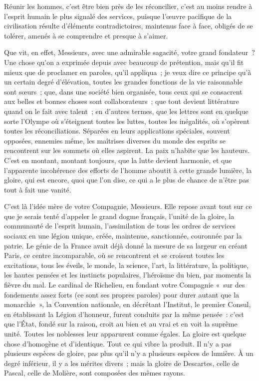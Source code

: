 \documentclass[french,twoside]{book} %
\newcommand\orgName[1]{#1}
\newcommand\persName[1]{#1}
\newcommand\placeName[1]{#1}
\begin{document}
\noindent Réunir les hommes, c’est être bien près de les réconcilier, c’est au moins rendre à l’esprit humain le plus signalé des services, puisque l’œuvre pacifique de la civilisation résulte d’éléments contradictoires, maintenus face à face, obligés de se tolérer, amenés à se comprendre et presque à s’aimer.\par
Que vit, en effet, Messieurs, avec une admirable sagacité, votre grand fondateur ? Une chose qu’on a exprimée depuis avec beaucoup de prétention, mais qu’il fit mieux que de proclamer en paroles, qu’il appliqua ; je veux dire ce principe qu’à un certain degré d’élévation, toutes les grandes fonctions de la vie raisonnable sont sœurs ; que, dans une société bien organisée, tous ceux qui se consacrent aux belles et bonnes choses sont collaborateurs ; que tout devient littérature quand on le fait avec talent ; en d’autres termes, que les lettres sont en quelque sorte l’Olympe où s’éteignent toutes les luttes, toutes les inégalités, où s’opèrent toutes les réconciliations. Séparées en leurs applications spéciales, souvent opposées, ennemies même, les maîtrises diverses du monde des esprits se rencontrent sur les sommets où elles aspirent. La paix n’habite que les hauteurs. C’est en montant, montant toujours, que la lutte devient harmonie, et que l’apparente incohérence des efforts de l’homme aboutit à cette grande lumière, la gloire, qui est encore, quoi que l’on dise, ce qui a le plus de chance de n’être pas tout à fait une vanité.\par
C’est là l’idée mère de votre {\orgName Compagnie}, Messieurs. Elle repose avant tout sur ce que je serais tenté d’appeler le grand dogme français, l’unité de la gloire, la communauté de l’esprit humain, l’assimilation de tous les ordres de services sociaux en une légion unique, créée, maintenue, sanctionnée, couronnée par la patrie. Le génie de la {\placeName France} avait déjà donné la mesure de sa largeur en créant {\placeName Paris}, ce centre incomparable, où se rencontrent et se croisent toutes les excitations, tous les éveils, le monde, la science, l’art, la littérature, la politique, les hautes pensées et les instincts populaires, l’héroïsme du bien, par moments la fièvre du mal. Le {\persName cardinal de Richelieu}, en fondant votre {\orgName Compagnie} « sur des fondements assez forts (ce sont ses propres paroles) pour durer autant que la monarchie », la {\orgName Convention nationale}, en décrétant l’{\orgName Institut}, le {\orgName premier Consul}, en établissant la Légion d’honneur, furent conduits par la même pensée : c’est que l’{\orgName État}, fondé sur la raison, croit au bien et au vrai et en voit la suprême unité. Toutes les noblesses leur apparurent comme égales. La gloire est quelque chose d’homogène et d’identique. Tout ce qui vibre la produit. Il n’y a pas plusieurs espèces de gloire, pas plus qu’il n’y a plusieurs espèces de lumière. À un degré inférieur, il y a les mérites divers ; mais la gloire de {\persName Descartes}, celle de {\persName Pascal}, celle de {\persName Molière}, sont composées des mêmes rayons.\par
\end{document}
